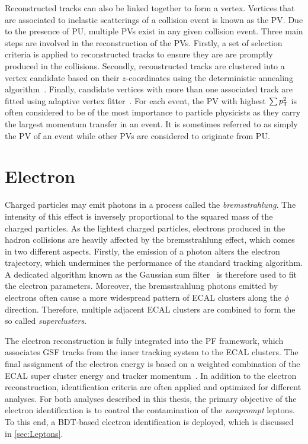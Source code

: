 Reconstructed tracks can also be linked together to form a vertex. Vertices that are associated to inelastic scatterings of a collision event is known as the \ac{PV}. Due to the presence of \ac{PU}, multiple \acp{PV} exist in any given collision event. Three main steps are involved in the reconstruction of the \acp{PV}. Firstly, a set of selection criteria is applied to reconstructed tracks to ensure they are are promptly produced in the collisions. Secondly, reconstructed tracks are clustered into a vertex candidate based on their $z$-coordinates using the deterministic annealing algorithm~\cite{Rose:1998dzq}. Finally, candidate vertices with more than one associated track are fitted using adaptive vertex fitter~\cite{Fruhwirth:2007hz}. For each event, the \ac{PV} with highest $\sum p_{\textsf{T}}^2$ is often considered to be of the most importance to particle physicists as they carry the largest momentum transfer in an event. It is sometimes referred to as simply the \ac{PV} of an event while other \acp{PV} are considered to originate from \ac{PU}.

\section{Electron}
\label{sec:Electron}

Charged particles may emit photons in a process called the \emph{bremsstrahlung}. The intensity of this effect is inversely proportional to the squared mass of the charged particles. As the lightest charged particles, electrons produced in the hadron collisions are heavily affected by the bremsstrahlung effect, which comes in two different aspects. Firstly, the emission of a photon alters the electron trajectory, which undermines the performance of the standard tracking algorithm. A dedicated algorithm known as the Gaussian sum filter~\cite{Adam_2005} is therefore used to fit the electron parameters. Moreover, the bremsstrahlung photons emitted by electrons often cause a more widespread pattern of \ac{ECAL} clusters along the $\phi$ direction. Therefore, multiple adjacent \ac{ECAL} clusters are combined to form the so called \emph{superclusters}.

The electron reconstruction is fully integrated into the \ac{PF} framework, which associates GSF tracks from the inner tracking system to the \ac{ECAL} clusters. The final assignment of the electron energy is based on a weighted combination of the \ac{ECAL} super cluster energy and tracker momentum~\cite{Baffioni:2006cd}. In addition to the electron reconstruction, identification criteria are often applied and optimized for different analyses. For both analyses described in this thesis, the primary objective of the electron identification is to control the contamination of the \emph{nonprompt} leptons. To this end, a \ac{BDT}-based electron identification is deployed, which is discussed in \autoref{sec:Leptons}.

